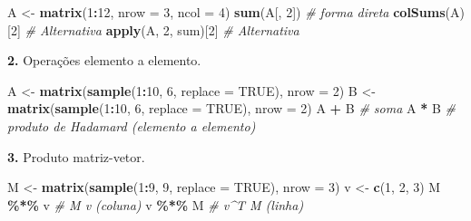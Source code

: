 \documentclass[
  portuguese,
  11pt,
  openany]{book}
\newenvironment{Shaded}{\begin{snugshade}}{\end{snugshade}}
\newcommand{\AttributeTok}[1]{\textcolor[rgb]{0.13,0.29,0.53}{#1}}
\newcommand{\CommentTok}[1]{\textcolor[rgb]{0.56,0.35,0.01}{\textit{#1}}}
\newcommand{\ConstantTok}[1]{\textcolor[rgb]{0.56,0.35,0.01}{#1}}
\newcommand{\DecValTok}[1]{\textcolor[rgb]{0.00,0.00,0.81}{#1}}
\newcommand{\FunctionTok}[1]{\textcolor[rgb]{0.13,0.29,0.53}{\textbf{#1}}}
\newcommand{\NormalTok}[1]{#1}
\newcommand{\OtherTok}[1]{\textcolor[rgb]{0.56,0.35,0.01}{#1}}
\newcommand{\SpecialCharTok}[1]{\textcolor[rgb]{0.81,0.36,0.00}{\textbf{#1}}}
\begin{document}
\begin{Shaded}
\begin{Highlighting}[]
\NormalTok{A }\OtherTok{\textless{}{-}} \FunctionTok{matrix}\NormalTok{(}\DecValTok{1}\SpecialCharTok{:}\DecValTok{12}\NormalTok{, }\AttributeTok{nrow =} \DecValTok{3}\NormalTok{, }\AttributeTok{ncol =} \DecValTok{4}\NormalTok{)}
\FunctionTok{sum}\NormalTok{(A[, }\DecValTok{2}\NormalTok{])        }\CommentTok{\# forma direta}
\FunctionTok{colSums}\NormalTok{(A)[}\DecValTok{2}\NormalTok{]      }\CommentTok{\# Alternativa}
\FunctionTok{apply}\NormalTok{(A, }\DecValTok{2}\NormalTok{, sum)[}\DecValTok{2}\NormalTok{] }\CommentTok{\# Alternativa}
\end{Highlighting}
\end{Shaded}

\textbf{2.} Operações elemento a elemento.

\begin{Shaded}
\begin{Highlighting}[]
\NormalTok{A }\OtherTok{\textless{}{-}} \FunctionTok{matrix}\NormalTok{(}\FunctionTok{sample}\NormalTok{(}\DecValTok{1}\SpecialCharTok{:}\DecValTok{10}\NormalTok{, }\DecValTok{6}\NormalTok{, }\AttributeTok{replace =} \ConstantTok{TRUE}\NormalTok{), }\AttributeTok{nrow =} \DecValTok{2}\NormalTok{)}
\NormalTok{B }\OtherTok{\textless{}{-}} \FunctionTok{matrix}\NormalTok{(}\FunctionTok{sample}\NormalTok{(}\DecValTok{1}\SpecialCharTok{:}\DecValTok{10}\NormalTok{, }\DecValTok{6}\NormalTok{, }\AttributeTok{replace =} \ConstantTok{TRUE}\NormalTok{), }\AttributeTok{nrow =} \DecValTok{2}\NormalTok{)}
\NormalTok{A }\SpecialCharTok{+}\NormalTok{ B    }\CommentTok{\# soma}
\NormalTok{A }\SpecialCharTok{*}\NormalTok{ B    }\CommentTok{\# produto de Hadamard (elemento a elemento)}
\end{Highlighting}
\end{Shaded}

\textbf{3.} Produto matriz-vetor.

\begin{Shaded}
\begin{Highlighting}[]
\NormalTok{M }\OtherTok{\textless{}{-}} \FunctionTok{matrix}\NormalTok{(}\FunctionTok{sample}\NormalTok{(}\DecValTok{1}\SpecialCharTok{:}\DecValTok{9}\NormalTok{, }\DecValTok{9}\NormalTok{, }\AttributeTok{replace =} \ConstantTok{TRUE}\NormalTok{), }\AttributeTok{nrow =} \DecValTok{3}\NormalTok{)}
\NormalTok{v }\OtherTok{\textless{}{-}} \FunctionTok{c}\NormalTok{(}\DecValTok{1}\NormalTok{, }\DecValTok{2}\NormalTok{, }\DecValTok{3}\NormalTok{)}
\NormalTok{M }\SpecialCharTok{\%*\%}\NormalTok{ v   }\CommentTok{\# M v (coluna)}
\NormalTok{v }\SpecialCharTok{\%*\%}\NormalTok{ M   }\CommentTok{\# v\^{}T M (linha)}
\end{Highlighting}
\end{Shaded}
\end{document}

